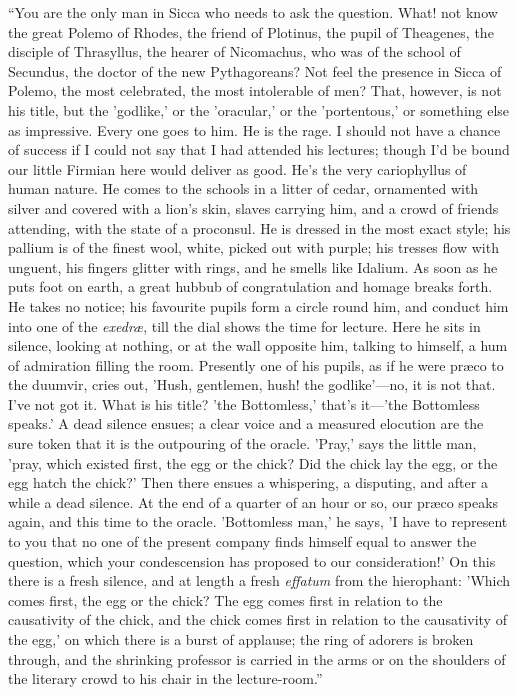 ``You are the only man in Sicca who needs to ask the question.
What! not know the great Polemo of Rhodes, the friend of Plotinus, the
pupil of Theagenes, the disciple of Thrasyllus, the hearer of
Nicomachus, who was of the school of Secundus, the doctor of the new
Pythagoreans? Not feel the presence in Sicca of Polemo, the most
celebrated, the most intolerable of men? That, however, is not his
title, but the 'godlike,' or the 'oracular,' or the 'portentous,' or
something else as impressive. Every one goes to him. He is the rage. I
should not have a chance of success if I could not say that I had
attended his lectures; though I'd be bound our little Firmian
here would deliver as good. He's the very cariophyllus of human
nature. He comes to the schools in a litter of cedar, ornamented with
silver and covered with a lion's skin, slaves carrying him, and a
crowd of friends attending, with the state of a proconsul. He is
dressed in the most exact style; his pallium is of the finest wool,
white, picked out with purple; his tresses flow with unguent, his
fingers glitter with rings, and he smells like Idalium. As soon as he
puts foot on earth, a great hubbub of congratulation and homage breaks
forth. He takes no notice; his favourite pupils form a circle round
him, and conduct him into one of the \emph{exedræ}, till the dial
shows the time for lecture. Here he sits in silence, looking at
nothing, or at the wall opposite him, talking to himself, a hum of
admiration filling the room. Presently one of his pupils, as if he
were præco to the duumvir, cries out, 'Hush, gentlemen, hush! the
godlike'—no, it is not that. I've not got it. What is his title?
'the Bottomless,' that's it—'the Bottomless speaks.' A dead silence
ensues; a clear voice and a measured elocution are the sure token that
it is the outpouring of the oracle. 'Pray,' says the little man,
'pray, which existed first, the egg or the chick? Did the chick lay
the egg, or the egg hatch the chick?' Then there ensues a whispering,
a disputing, and after a while a dead silence. At the end of a quarter
of an hour or so, our præco speaks again, and this time to the
oracle. 'Bottomless man,' he says, 'I have to represent to you that no
one of the present company finds himself equal to answer the
question, which your condescension has proposed to our consideration!'
On this there is a fresh silence, and at length a fresh \emph{effatum}
from the hierophant: 'Which comes first, the egg or the chick? The egg
comes first in relation to the causativity of the chick, and the chick
comes first in relation to the causativity of the egg,' on which there
is a burst of applause; the ring of adorers is broken through, and the
shrinking professor is carried in the arms or on the shoulders of the
literary crowd to his chair in the lecture-room.''

